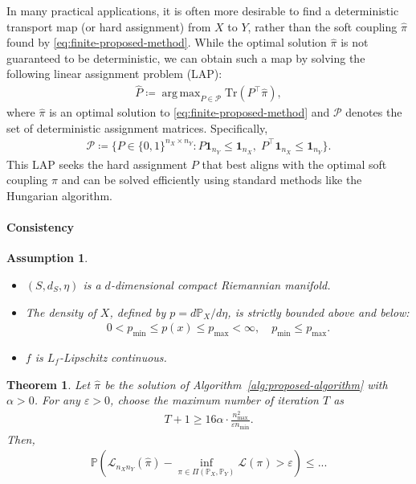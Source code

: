 \documentclass{article}
\newtheorem{theorem}{Theorem}
\newtheorem{assumption}{Assumption}
\DeclareMathOperator*{\argmax}{arg\,max}
\begin{document}
In many practical applications, it is often more desirable to find a deterministic transport map (or hard assignment) from $X$ to $Y$, rather than the soft coupling $\hat{\pi}$ found by \eqref{eq:finite-proposed-method}. While the optimal solution $\hat{\pi}$ is not guaranteed to be deterministic, we can obtain such a map by solving the following linear assignment problem (LAP):
\begin{align}
	\label{eq:finite-projection-method}
	\hat{P} \coloneqq \argmax_{P \in \mathcal{P}} \mathrm{Tr}(P^\top\hat{\pi}) ,
\end{align}
where $\hat{\pi}$ is an optimal solution to \eqref{eq:finite-proposed-method} and $\mathcal{P}$ denotes the set of deterministic assignment matrices. Specifically, 
\begin{align}
	\label{eq:assign-matrix-space}
	\mathcal{P} \coloneqq \{P \in \{0,1\}^{n_X \times n_Y}: P\mathbf{1}_{n_Y} \leq \mathbf{1}_{n_X}, \; P^\top\mathbf{1}_{n_X} \leq \mathbf{1}_{n_Y}\} .
\end{align}
This LAP seeks the hard assignment $P$ that best aligns with the optimal soft coupling $\hat{\pi}$ and can be solved efficiently using standard methods like the Hungarian algorithm.



\paragraph{Consistency}

\begin{assumption}
	$ $
	\begin{itemize}
		\item[(A1)] $(S,d_S,\eta)$ is a $d$-dimensional compact Riemannian manifold.
		\item[(A2)] The density of $X$, defined by $p = d\mathbb{P}_X/d\eta$, is strictly bounded above and below:
		\begin{align*}
			0 < p_{\min} \leq p(x) \leq p_{\max} < \infty , \quad p_{\min} \leq p_{\max} .
		\end{align*}
		\item[(A3)] $f$ is $L_f$-Lipschitz continuous.
	\end{itemize}
\end{assumption}

\begin{theorem}
	\label{thm:consistency}
	Let $\hat{\pi}$ be the solution of Algorithm~\ref{alg:proposed-algorithm} with $\alpha > 0$. For any $\varepsilon > 0$, choose the maximum number of iteration $T$ as
	\begin{align*}
		T + 1 \geq 16\alpha \cdot \frac{n_{\max}^2}{\varepsilon n_{\min}} .
	\end{align*}
	Then,
	\begin{align*}
		\mathbb{P}\left(\mathcal{L}_{n_Xn_Y}(\hat{\pi}) - \inf_{\pi \in \Pi(\mathbb{P}_X,\mathbb{P}_Y)} \mathcal{L}(\pi) > \varepsilon \right) \leq ...
	\end{align*}
\end{theorem}
\end{document}
